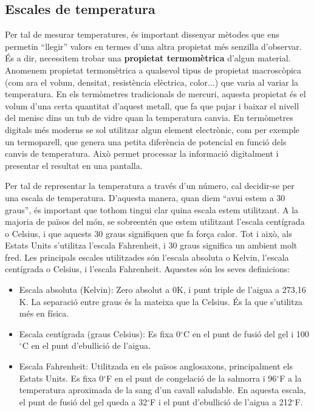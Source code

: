 \documentclass[12pt]{book}
\begin{document}
\subsection{Escales de temperatura}

Per tal de mesurar temperatures, és important dissenyar mètodes que ens permetin ``llegir'' valors en termes d'una altra propietat més senzilla d'observar. És a dir, necessitem trobar una {\bf propietat termomètrica} d'algun material. Anomenem propietat termomètrica a qualsevol tipus de propietat macroscòpica (com ara el volum, densitat, resistència elèctrica, color...) que varia al variar la temperatura. En els termòmetres tradicionals de mercuri, aquesta propietat és el volum d'una certa quantitat d'aquest metall, que fa que pujar i baixar el nivell del menisc dins un tub de vidre quan la temperatura canvia. En termòmetres digitals més moderns se sol utilitzar algun element electrònic, com per exemple un termoparell, que genera una petita diferència de potencial en funció dels canvis de temperatura. Això permet processar la informació digitalment i presentar el resultat en una pantalla.

Per tal de representar la temperatura a través d'un número, cal decidir-se per una escala de temperatura. D'aquesta manera, quan diem ``avui estem a 30 graus'', és important que tothom tingui clar quina escala estem utilitzant. A la majoria de països del món, se sobreentén que estem utilitzant l'escala centígrada o Celsius, i que aquests 30 graus signifiquen que fa força calor. Tot i això, als Estats Units s'utilitza l'escala Fahrenheit, i 30 graus significa un ambient molt fred. Les principals escales utilitzades són l'escala absoluta o Kelvin, l'escala centígrada o Celsius, i l'escala Fahrenheit. Aquestes són les seves definicions:

\begin{itemize}
    \item Escala absoluta (Kelvin): Zero absolut a 0K, i punt triple de l'aigua a 273,16 K. La separació entre graus és la mateixa que la Celsius. És la que s'utilitza més en física. 
    \item Escala centígrada (graus Celsius): Es fixa 0$^\circ$C en el punt de fusió del gel i 100$^\circ$C en el punt d'ebullició de l'aigua. 
    \item Escala Fahrenheit:  Utilitzada en els països anglosaxons, principalment els Estats Units. Es fixa 0$^\circ$F en el punt de congelació de la salmorra i 96$^\circ$F a la temperatura aproximada de la sang d'un cavall saludable. En aquesta escala, el punt de fusió del gel queda a 32$^\circ$F i el punt d'ebullició de l'aigua a 212$^\circ$F.
\end{itemize}
\end{document}
